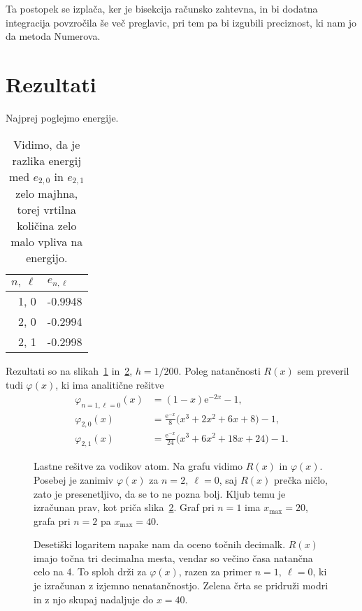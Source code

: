 \documentclass[a4 paper, 12pt]{article}
\newcommand{\e}{
	\ensuremath{\mathrm{e}}
}
\begin{document}
Ta postopek se izpla\v ca, ker je bisekcija ra\v cunsko zahtevna, in bi dodatna integracija
povzro\v cila \v se ve\v c preglavic, pri tem pa bi izgubili preciznost, ki nam jo da metoda
Numerova.

\section{Rezultati}

Najprej poglejmo energije.
\begin{table}[H]\centering
	\caption{Vidimo, da je razlika energij med $e_{2,0}$ in $e_{2,1}$ zelo majhna, torej
		vrtilna koli\v cina zelo malo vpliva na energijo.}
	\begin{tabular}{r|l}
		$n,\ \ell$ & $e_{n, \ell}$ \\
		\hline
		1, 0 & -0.9948 \\
		2, 0 & -0.2994 \\
		2, 1 & -0.2998
	\end{tabular}
\end{table}

Rezultati so na slikah~\ref{gr1} in~\ref{gr2}, $h = 1/200$. Poleg natan\v cnosti $R(x)$ sem preveril tudi $\varphi(x)$,
ki ima analiti\v cne re\v sitve
\begin{align*}
	\varphi_{n = 1,\ell = 0} (x) &= (1 - x)\e^{-2x} - 1, \\
	\varphi_{2,0} (x) &= \frac{\e^{-x}}{8}\big(x^3 + 2x^2 + 6x + 8\big) - 1, \\
	\varphi_{2,1} (x) &= \frac{\e^{-x}}{24}\big(x^3 + 6x^2 + 18x + 24\big) - 1.
\end{align*}
\begin{figure}[H]\centering
	
	\caption{Lastne re\v sitve za vodikov atom. Na grafu vidimo $R(x)$ in $\varphi(x)$. Posebej je zanimiv
		$\varphi(x)$ za $n = 2,\ \ell = 0$, saj $R(x)$ pre\v cka ni\v clo, zato je presenetljivo, da se
		to ne pozna bolj. Kljub temu je izra\v cunan prav, kot pri\v ca slika~\ref{gr2}. Graf pri $n = 1$ ima
		$x_\text{max} = 20$, grafa pri $n = 2$ pa $x_\text{max} = 40$.}
	\label{gr1}
\end{figure}

\begin{figure}[H]\centering
	
	\caption{Deseti\v ski logaritem napake nam da oceno to\v cnih decimalk. $R(x)$ imajo to\v cna tri decimalna
		mesta, vendar so ve\v cino \v casa natan\v cna celo na 4. To sploh dr\v zi za $\varphi(x)$, razen
		za primer $n = 1,\ \ell = 0$, ki je izra\v cunan z izjemno nenatan\v cnostjo. Zelena \v crta se
		pridru\v zi modri in z njo skupaj nadaljuje do $x = 40$.}
	\label{gr2}
\end{figure}
\end{document}
